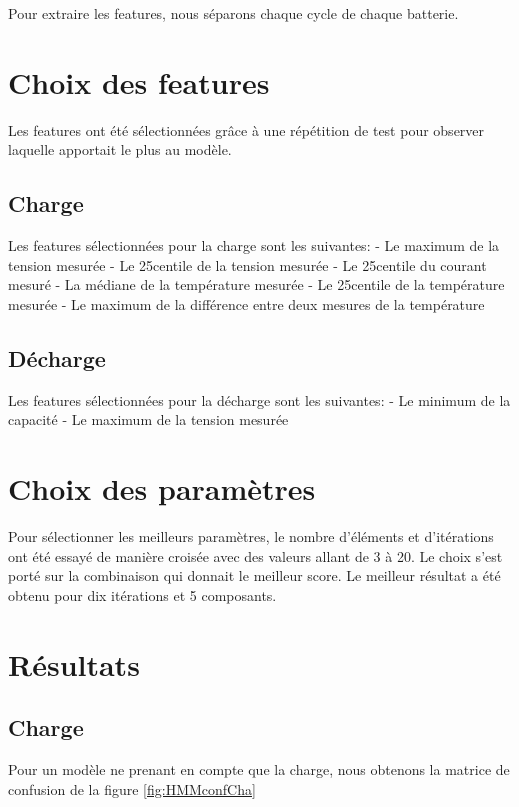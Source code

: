 Pour extraire les features, nous séparons chaque cycle de chaque batterie. 

\section{Choix des features}
Les features ont été sélectionnées grâce à une répétition de test pour observer laquelle
apportait le plus au modèle.

\subsection{Charge}
Les features sélectionnées pour la charge sont les suivantes:
- Le maximum de la tension mesurée
- Le 25\ieme centile de la tension mesurée
- Le 25\ieme centile du courant mesuré
- La médiane de la température mesurée
- Le 25\ieme centile de la température mesurée
- Le maximum de la différence entre deux mesures de la température

\subsection{Décharge}
Les features sélectionnées pour la décharge sont les suivantes:
- Le minimum de la capacité
- Le maximum de la tension mesurée

\section{Choix des paramètres}
Pour sélectionner les meilleurs paramètres, le nombre d'éléments et d'itérations ont été essayé de manière croisée avec des valeurs allant de 3 à 20.
Le choix s'est porté sur la combinaison qui donnait le meilleur score.
Le meilleur résultat a été obtenu pour dix itérations et 5 composants.

\section{Résultats}
\subsection{Charge}
Pour un modèle ne prenant en compte que la charge, nous obtenons la matrice de confusion de la figure \ref{fig:HMMconfCha}

